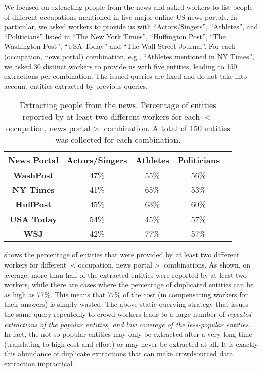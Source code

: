 \begin{example}
We focused on extracting people from the news and asked workers to list people of different occupations mentioned in five major online US news portals. 
In particular, we asked workers to provide us with ``Actors/Singers'', ``Athletes'', and ``Politicians'' 
listed in ``The New York Times'',  ``Huffington Post'', ``The Washington Post'', ``USA  Today'' and 
``The Wall Street Journal''. For each (occupation, news portal) combination, e.g., ``Athletes mentioned in NY Times'', 
we asked 30 distinct workers to provide us with five entities, leading to 150 extractions per combination. The issued queries are fixed and do not take into account entities extracted by previous queries.
\end{example}
\begin{table}[h]
\center
\caption{Extracting people from the news. Percentage of entities reported by at least two different workers for each $<$occupation, news portal$>$ combination. A total of 150 entities was collected for each combination.}
\label{tab:duplicates}
\begin{tabular}{|c|c|c|c|c|}
\hline
News Portal & {\bf Actors/Singer}s & {\bf Athletes} & \textbf{Politicians}\\ \hline
{\bf WashPost} & 47\% & 55\% & 56\% \\
{\bf NY Times} & 41\%& 65\% & 53\% \\
{\bf HuffPost} & 45\% & 63\% & 60\% \\
{\bf USA Today} & 54\% & 45\% & 57\% \\
{\bf WSJ} & 42\% & 77\% & 57\% \\
\hline
\end{tabular}
\end{table}

 shows the percentage of entities that were provided by at least two different workers for different $<$occupation, news portal$>$ combinations. As shown, on average, more than half of the extracted entities were reported by at least two workers, while there are cases where the percentage of duplicated entities can be as high as 77\%. This means that 77\% of the cost (in compensating workers for their answers) is simply wasted. The above static querying strategy that issues the same query repeatedly to crowd workers leads to a large number of {\em repeated extractions of the popular entities, and low coverage of the less-popular entities}. In fact, the not-so-popular entities may only be extracted after a very long time (translating to high cost and effort) or may never be extracted at all. It is exactly this abundance of duplicate extractions that can make crowdsourced data extraction impractical.

